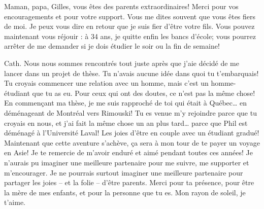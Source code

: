 Maman, papa, Gilles, vous êtes des parents extraordinaires! Merci pour
vos encouragements et pour votre support. Vous me dites souvent que vous
êtes fiers de moi. Je peux vous dire en retour que je suis fier d'être
votre fils. Vous pouvez maintenant vous réjouir : à 34 ans, je quitte
enfin les bancs d'école; vous pourrez arrêter de me demander si je dois
étudier le soir ou la fin de semaine!

Cath. Nous nous sommes rencontrés tout juste après que j'aie décidé de
me lancer dans un projet de thèse. Tu n'avais aucune idée dans quoi tu
t'embarquais! Tu croyais commencer une relation avec un homme, mais
c'est un homme-étudiant que tu as eu. Pour ceux qui ont des doutes, ce
n'est pas la même chose! En commençant ma thèse, je me suis rapproché de
toi qui était à Québec\ldots{} en déménageant de Montréal vers Rimouski!
Tu es venue m'y rejoindre parce que tu croyais en nous, et j'ai fait la
même chose un an plus tard\ldots{} parce que Phil est déménagé à
l'Université Laval! Les joies d'être en couple avec un étudiant gradué!
Maintenant que cette aventure s'achève, ça sera à mon tour de te payer
un voyage en Asie! Je te remercie de m'avoir enduré et aimé pendant
toutes ces années! Je n'aurais pu imaginer une meilleure partenaire pour
me suivre, me supporter et m'encourager. Je ne pourrais surtout imaginer
une meilleure partenaire pour partager les joies -- et la folie --
d'être parents. Merci pour ta présence, pour être la mère de mes
enfants, et pour la personne que tu es. Mon rayon de soleil, je t'aime.
